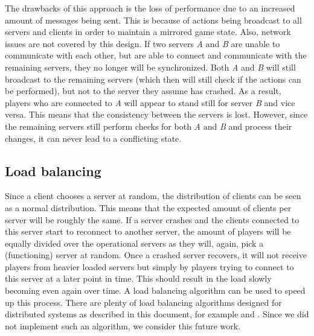 		The drawbacks of this approach is the loss of performance due to an increased amount of messages being sent. 
		This is because of actions being broadcast to all servers and clients in order to maintain a mirrored game state. 
		Also, network issues are not covered by this design. 
		If two servers \emph{A} and \emph{B} are unable to communicate with each other, but are able to connect and communicate with the remaining servers, they no longer will be synchronized. 
		Both \emph{A} and \emph{B} will still broadcast to the remaining servers (which then will still check if the actions can be performed), but not to the server they assume has crashed. 
		As a result, players who are connected to \emph{A} will appear to stand still for server \emph{B} and vice versa. 
		This means that the consistency between the servers is lost. 
		However, since the remaining servers still perform checks for both \emph{A} and \emph{B} and process their changes, it can never lead to a conflicting state.
	
	\subsection{Load balancing}
	\label{subsec:load_balancing}
		Since a client chooses a server at random, the distribution of clients can be seen as a normal distribution. 
		This means that the expected amount of clients per server will be roughly the same.
		If a server crashes and the clients connected to this server start to reconnect to another server, the amount of players will be equally divided over the operational servers as they will, again, pick a (functioning) server at random.
		Once a crashed server recovers, it will not receive players from heavier loaded servers but simply by players trying to connect to this server at a later point in time. 
		This should result in the load slowly becoming even again over time. 
		A load balancing algorithm can be used to speed up this process.
		There are plenty of load balancing algorithms designed for distributed systems as described in this document, for example \cite{wolff2001dynamic} and \cite{ballard2000client}. Since we did not implement such an algorithm, we consider this future work.
		
